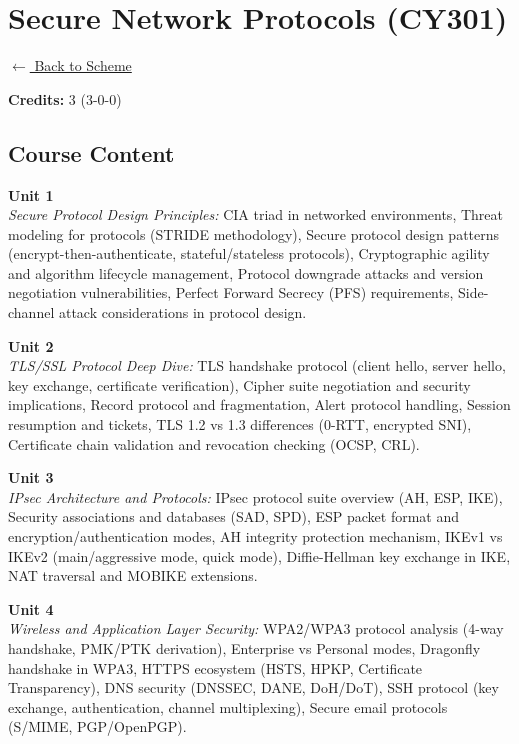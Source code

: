 \section*{Secure Network Protocols (CY301)}
\label{major:CS_3}

\noindent \small{\hyperref[main:scheme]{$\leftarrow$ Back to Scheme}} \vspace{0.5cm}

\noindent \textbf{Credits:} 3 (3-0-0)

\subsection*{Course Content}
\noindent\textbf{Unit 1} \\
\textit{Secure Protocol Design Principles:} CIA triad in networked environments, Threat modeling for protocols (STRIDE methodology), Secure protocol design patterns (encrypt-then-authenticate, stateful/stateless protocols), Cryptographic agility and algorithm lifecycle management, Protocol downgrade attacks and version negotiation vulnerabilities, Perfect Forward Secrecy (PFS) requirements, Side-channel attack considerations in protocol design.

\vspace{0.3cm}

\noindent\textbf{Unit 2} \\
\textit{TLS/SSL Protocol Deep Dive:} TLS handshake protocol (client hello, server hello, key exchange, certificate verification), Cipher suite negotiation and security implications, Record protocol and fragmentation, Alert protocol handling, Session resumption and tickets, TLS 1.2 vs 1.3 differences (0-RTT, encrypted SNI), Certificate chain validation and revocation checking (OCSP, CRL).

\vspace{0.3cm}

\noindent\textbf{Unit 3} \\
\textit{IPsec Architecture and Protocols:} IPsec protocol suite overview (AH, ESP, IKE), Security associations and databases (SAD, SPD), ESP packet format and encryption/authentication modes, AH integrity protection mechanism, IKEv1 vs IKEv2 (main/aggressive mode, quick mode), Diffie-Hellman key exchange in IKE, NAT traversal and MOBIKE extensions.

\vspace{0.3cm}

\noindent\textbf{Unit 4} \\
\textit{Wireless and Application Layer Security:} WPA2/WPA3 protocol analysis (4-way handshake, PMK/PTK derivation), Enterprise vs Personal modes, Dragonfly handshake in WPA3, HTTPS ecosystem (HSTS, HPKP, Certificate Transparency), DNS security (DNSSEC, DANE, DoH/DoT), SSH protocol (key exchange, authentication, channel multiplexing), Secure email protocols (S/MIME, PGP/OpenPGP).

